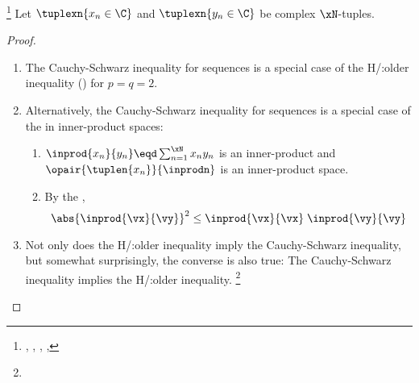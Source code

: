 \begin{theorem}
\footnote{
  ,
  ,
  ,
  ,
  }
\label{thm:seq_cs}
Let $\tuplexn{x_n\in\C}$ and $\tuplexn{y_n\in\C}$ be complex $\xN$-tuples.
\end{theorem}
\begin{proof}
\begin{enumerate}
  \item The Cauchy-Schwarz inequality for sequences is a special case of the H/:older inequality ()
        for $p=q=2$.

  \item Alternatively, the Cauchy-Schwarz inequality for sequences is a special case of
        the  in inner-product spaces:
    \begin{enumerate}
      \item $\inprod{x_n}{y_n}\eqd\sum_{n=1}^{\xN}x_n y_n$ is an inner-product and $\opair{\tuplen{x_n}}{\inprodn}$ is an inner-product space.
      \item By the ,
        \[\abs{\inprod{\vx}{\vy}}^2 \le \inprod{\vx}{\vx} \; \inprod{\vy}{\vy}\]
    \end{enumerate}

  \item Not only does the H/:older inequality imply the Cauchy-Schwarz inequality, but somewhat surprisingly,
        the converse is also true: The Cauchy-Schwarz inequality implies the H/:older inequality.%
        \footnote{
          }
\end{enumerate}
\end{proof}


